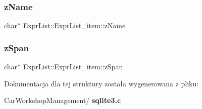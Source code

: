 \mbox{\label{struct_expr_list_1_1_expr_list__item_af278eb03a1169c73d144547adaf9b04f}} 
\subsubsection{zName}
{\footnotesize\ttfamily char$\ast$ Expr\+List\+::\+Expr\+List\+\_\+item\+::z\+Name}

\mbox{\label{struct_expr_list_1_1_expr_list__item_ade485bb6fafb44ec2aba59d05b8d117b}} 
\subsubsection{zSpan}
{\footnotesize\ttfamily char$\ast$ Expr\+List\+::\+Expr\+List\+\_\+item\+::z\+Span}



Dokumentacja dla tej struktury została wygenerowana z pliku\+:\begin{DoxyCompactItemize}
\item 
Car\+Workshop\+Management/\textbf{ sqlite3.\+c}\end{DoxyCompactItemize}
